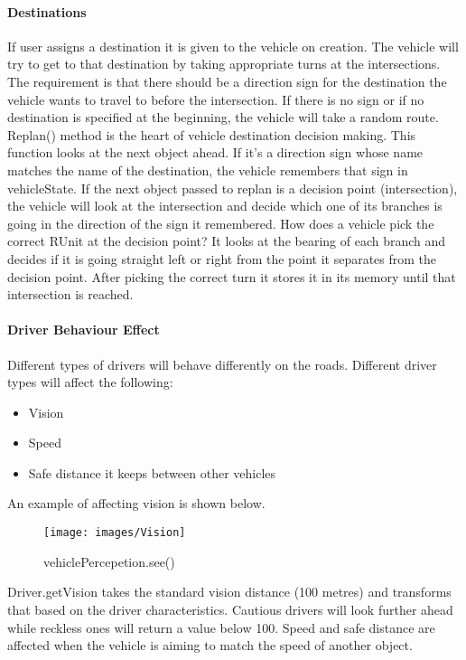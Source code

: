 \documentclass[11pt,a4paper]{article}
\begin{document}
  	
  	\paragraph{Destinations}
  	
  	If user assigns a destination it is given to the vehicle on creation. The vehicle will try to get to that destination by taking appropriate turns at the intersections. The requirement is that there should be a direction sign for the destination the vehicle wants to travel to before the intersection. If there is no sign or if no destination is specified at the beginning, the vehicle will take a random route.
Replan() method is the heart of vehicle destination decision making. This function looks at the next object ahead. If it’s a direction sign whose name matches the name of the destination, the vehicle remembers that sign in vehicleState. If the next object passed to replan is a decision point (intersection), the vehicle will look at the intersection and decide which one of its branches is going in the direction of the sign it remembered. 
How does a vehicle pick the correct RUnit at the decision point? It looks at the bearing of each branch and decides if it is going straight left or right from the point it separates from the decision point. After picking the correct turn it stores it in its memory until that intersection is reached.

  	\paragraph{Driver Behaviour Effect}
  
  Different types of drivers will behave differently on the roads. Different driver types will affect the following:
  
  \begin{itemize}
  	\item Vision
  	\item Speed
  	\item Safe distance it keeps between other vehicles
  \end{itemize}
  
  An example of affecting vision is shown below.  
  
  \begin{figure}[h!]
			\texttt{[image: images/Vision]}
			\caption{vehiclePercepetion.see()}
			\centering
		\end{figure} 

Driver.getVision takes the standard vision distance (100 metres) and transforms that based on the driver characteristics. Cautious drivers will look further ahead while reckless ones will return a value below 100.
Speed and safe distance are affected when the vehicle is aiming to match the speed of another object.
	
\end{document}
